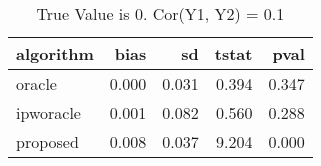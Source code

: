 \begin{table}[h!]

\caption{True Value is 0. Cor(Y1, Y2) = 0.1}
\centering
\begin{tabular}[t]{lrrrr}
\toprule
algorithm & bias & sd & tstat & pval\\
\midrule
oracle & 0.000 & 0.031 & 0.394 & 0.347\\
ipworacle & 0.001 & 0.082 & 0.560 & 0.288\\
proposed & 0.008 & 0.037 & 9.204 & 0.000\\
\bottomrule
\end{tabular}
\end{table}
